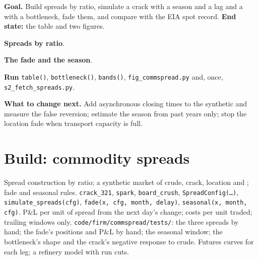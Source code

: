 \begin{tutorial}
\textbf{Goal.} Build spreads by ratio, simulate a crack with a season and a lag and a  with a bottleneck, fade them, and compare with
the EIA spot record. \textbf{End state:} the table and two figures.
\begin{tutsteps}
\item \textbf{Spreads by ratio}.
\label{lst:s2:commodity-spreads:build}
\item \textbf{The fade and the season}.
\label{lst:s2:commodity-spreads:fade}
\item \textbf{Run} \texttt{table()}, \texttt{bottleneck()}, \texttt{bands()}, \texttt{fig\_commspread.py} and, once,
\texttt{s2\_fetch\_spreads.py}.
\end{tutsteps}
\textbf{What to change next.} Add asynchronous closing times to the synthetic  and measure the false reversion; estimate the season
from past years only; stop the location fade when transport capacity is full.
\end{tutorial}

\section{Build: commodity spreads}\label{bld:s2:commodity-spreads:commspread}

\begin{build}
 Spread construction by ratio; a synthetic market of crude, crack, location and ; fade and seasonal rules.
 \texttt{crack\_321}, \texttt{spark}, \texttt{board\_crush}, \texttt{SpreadConfig(\dots)}, \texttt{simulate\_spreads(cfg)},
\texttt{fade(x, cfg, month, delay)}, \texttt{seasonal(x, month, cfg)}.
 P\&L per unit of spread from the next day's change; costs per unit traded; trailing windows only.
 \texttt{code/firm/commspread/tests/}: the three spreads by hand; the fade's positions and P\&L by hand; the seasonal
window; the bottleneck's shape and the crack's negative response to crude.
 Futures curves for each leg; a refinery model with run cuts.
\end{build}

